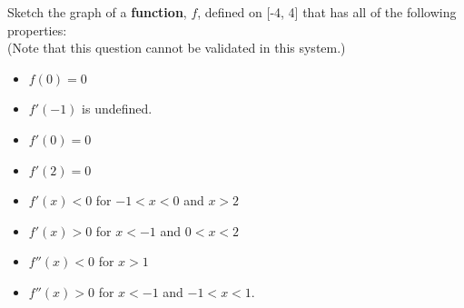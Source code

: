 \documentclass[handout]{ximera}
\begin{document}
\begin{problem}
Sketch the graph of a \textbf{function}, $f$, defined on [-4, 4] that has all of the following properties:
\\(Note that this question cannot be validated in this system.)
\begin{itemize}
	\item $f(0)=0$
	\medskip
	\item $f'(-1)$ is undefined.
	\medskip
	\item $f'(0)=0$
	\medskip
	\item $f'(2)=0$
	\medskip
	\item $f'(x)<0$ for $-1<x<0$ \hspace{0.1in} and  \hspace{0.1in} $x>2$
	\medskip
	\item $f'(x)>0$ for $x<-1$ \hspace{0.1in} and  \hspace{0.1in} $0<x<2$
	\medskip
	\item $f''(x)<0$ for $x>1$
	\medskip
	\item $f''(x)>0$ for $x<-1$  \hspace{0.1in} and \hspace{0.1in} $-1<x<1$.
	\end{itemize}
\end{problem}
\end{document}
